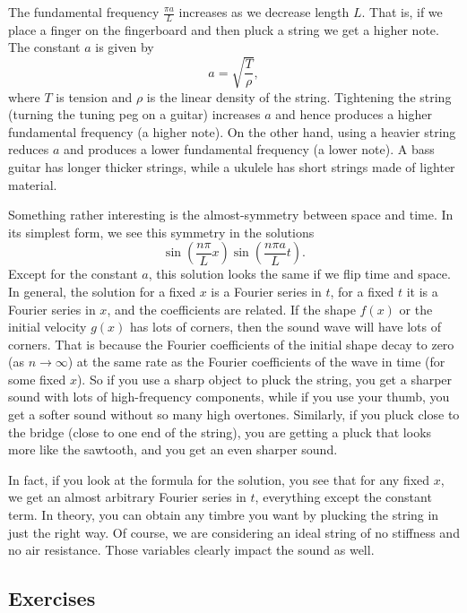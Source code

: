 The fundamental frequency $\frac{\pi a}{L}$ increases as we decrease length $L$.  That is, if
we place a finger on the fingerboard and then pluck a string we get a higher
note.  The constant $a$ is given by
\begin{equation*}
a = \sqrt{\frac{T}{\rho}} ,
\end{equation*}
where $T$ is tension and $\rho$ is the linear density of the string.
Tightening the string (turning the tuning peg on a guitar) increases $a$ and
hence produces a higher fundamental frequency (a higher note).
On the other hand, using a heavier string 
reduces $a$ and produces a lower fundamental frequency (a lower note).
A bass guitar has longer thicker strings, while a ukulele has short strings
made of lighter material.

Something rather interesting is the almost-symmetry between space and time.
In its simplest form, we see this symmetry in the solutions
\begin{equation*}
\sin \left( \frac{n \pi}{L} x \right)
\sin \left( \frac{n \pi a}{L} t \right)  .
\end{equation*}
Except for the constant $a$, this solution looks the same if we
flip time and space.
In general, the solution for a fixed $x$ is a Fourier series in $t$, for
a fixed $t$ it is a Fourier series in $x$, and the coefficients are related.
If the shape $f(x)$ or the initial velocity $g(x)$ has lots of corners, then
the sound wave will have lots of corners.  That is because the Fourier coefficients
of the initial shape decay to zero (as $n \to \infty$) at the same rate as the Fourier coefficients
of the wave in time (for some fixed $x$).  So if you use a sharp object to
pluck the string, you get a sharper sound with lots of high-frequency
components, while if you use your thumb, you get a softer sound without
so many high overtones.
Similarly, if you pluck close to the bridge (close
to one end of the string), you are
getting a pluck that looks more like the sawtooth, and you get an even
sharper sound.

In fact, if you look at the formula for the solution, you see that for any
fixed $x$, we get an almost arbitrary Fourier series in $t$, everything
except the constant term.  In theory, you can obtain any timbre you want
by plucking the string in just the right way.
Of course, we are considering an ideal string of no stiffness and no air
resistance.  Those variables clearly impact the sound as well.

\subsection{Exercises}

